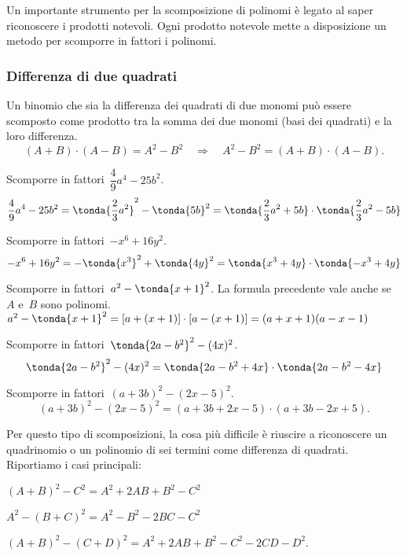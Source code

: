 Un importante strumento per la scomposizione di polinomi è legato al saper 
riconoscere i prodotti notevoli.
Ogni prodotto notevole mette a disposizione un metodo per scomporre in 
fattori i polinomi.

\subsubsection{Differenza di due quadrati}
\label{subsubsec:divpol_difquad}

Un binomio che sia la differenza dei quadrati di due monomi può essere 
scomposto come prodotto tra la somma dei due monomi (basi dei quadrati) e 
la loro differenza.
\begin{equation*}
(A+B)\cdot (A-B)=
A^{2}-B^{2}\quad \Rightarrow \quad A^{2}-B^{2}=(A+B)\cdot (A-B).
\end{equation*}

 \begin{esempio}
Scomporre in fattori~\(\dfrac{4}{9}a^{4}-25b^{2}\).
\[\dfrac{4}{9}a^{4}-25b^{2}=
  \tonda{\dfrac{2}{3}a^{2}}^{2}-\tonda{5b}^{2}=
  \tonda{\dfrac{2}{3}a^{2}+5b}\cdot \tonda{\dfrac{2}{3}a^{{2}}-5b}\]
 \end{esempio}

 \begin{esempio}
Scomporre in fattori~\(-x^{6}+16y^{2}\).
\[-x^{6}+16y^{2}=-\tonda{x^{3}}^{2}+\tonda{4y}^{2}=
  \tonda{x^{3}+4y}\cdot \tonda{-x^{3}+4y}\]
 \end{esempio}

 \begin{esempio}
Scomporre in fattori~\(a^{2}-\tonda{x+1}^{2}\).
La formula precedente vale anche se~\(A\) e~\(B\) sono polinomi. 
\(a^{2}-\tonda{x+1}^{2}=
 \left[a+(x+1)\right]\cdot \left[a-(x+1)\right]=(a+x+1)(a-x-1)\)
\end{esempio}

 \begin{esempio}
Scomporre in fattori~\(\tonda{2a-b^{2}}^{2}-(4x)^{2}\).
\[\tonda{2a-b^{2}}^{2}-(4x)^{2}=
\tonda{2a-b^{2}+4x}\cdot \tonda{2a-b^{2}-4x}\]
 \end{esempio}

 \begin{esempio}
Scomporre in fattori~\((a+3b)^{2}-(2x-5)^{2}\).
\[(a+3b)^{2}-(2x-5)^{2}=(a+3b+2x-5)\cdot (a+3b-2x+5).\]
 \end{esempio}

Per questo tipo di scomposizioni, la cosa più difficile è riuscire a 
riconoscere un quadrinomio o un polinomio di sei termini come differenza 
di quadrati. Riportiamo i casi principali:
\begin{itemize*}
 \item \((A+B)^{2}-C^{2}=A^{{2}}+2AB+B^{2}-C^{2}\)
 \item \(A^{2}-(B+C)^{2}=A^{2}-B^{2}-2BC-C^{2}\)
 \item \((A+B)^{2}-(C+D)^{2}=A^{2}+2AB+B^{2}-C^{2}-2CD-D^{2}\).
\end{itemize*}


